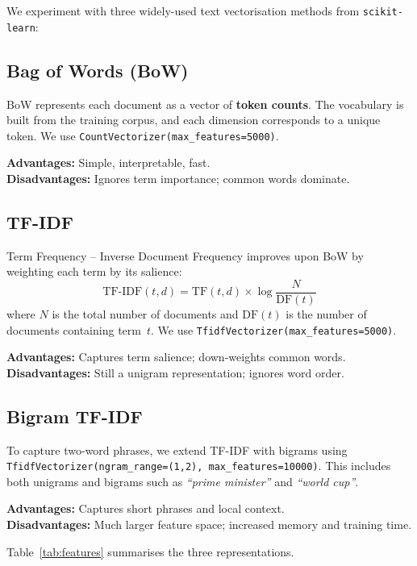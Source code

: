 \documentclass[conference, 10pt]{IEEEtran}
\begin{document}
We experiment with three widely-used text vectorisation methods from \texttt{scikit-learn}:

\subsection{Bag of Words (BoW)}

BoW represents each document as a vector of \textbf{token counts}.
The vocabulary is built from the training corpus, and each dimension corresponds to a unique token.
We use \texttt{CountVectorizer(max\_features=5000)}.

\textbf{Advantages:} Simple, interpretable, fast.\\
\textbf{Disadvantages:} Ignores term importance; common words dominate.

\subsection{TF-IDF}

Term Frequency -- Inverse Document Frequency improves upon BoW by weighting each term by its salience:
\begin{equation}
\text{TF-IDF}(t, d) = \text{TF}(t, d) \times \log\frac{N}{\text{DF}(t)}
\end{equation}
where $N$ is the total number of documents and $\text{DF}(t)$ is the number of documents containing term~$t$.
We use \texttt{TfidfVectorizer(max\_features=5000)}.

\textbf{Advantages:} Captures term salience; down-weights common words.\\
\textbf{Disadvantages:} Still a unigram representation; ignores word order.

\subsection{Bigram TF-IDF}

To capture two-word phrases, we extend TF-IDF with bigrams using \texttt{TfidfVectorizer(ngram\_range=(1,2), max\_features=10000)}.
This includes both unigrams and bigrams such as \emph{``prime minister''} and \emph{``world cup''}.

\textbf{Advantages:} Captures short phrases and local context.\\
\textbf{Disadvantages:} Much larger feature space; increased memory and training time.

Table~\ref{tab:features} summarises the three representations.
\end{document}
